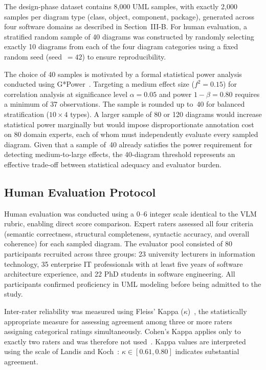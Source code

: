 \documentclass[conference]{IEEEtran}
\begin{document}
The design-phase dataset contains 8,000 UML samples, with exactly
2,000 samples per diagram type (class, object, component, package),
generated across four software domains as described in
Section~III-B. For human evaluation, a stratified random sample of
40 diagrams was constructed by randomly selecting exactly 10
diagrams from each of the four diagram categories using a fixed
random seed (seed~$= 42$) to ensure reproducibility.

The choice of 40 samples is motivated by a formal statistical power
analysis conducted using G*Power~\cite{faul2007}. Targeting a
medium effect size ($f^{2}=0.15$) for correlation analysis at
significance level $\alpha=0.05$ and power $1{-}\beta=0.80$
requires a minimum of 37 observations. The sample is rounded up
to~40 for balanced stratification ($10\times4$ types). A larger
sample of 80 or 120 diagrams would increase statistical power
marginally but would impose disproportionate annotation cost on 80
domain experts, each of whom must independently evaluate every sampled
diagram. Given that a sample of~40 already satisfies the power
requirement for detecting medium-to-large effects, the 40-diagram
threshold represents an effective trade-off between statistical
adequacy and evaluator burden.

\subsection{Human Evaluation Protocol}

Human evaluation was conducted using a 0--6 integer scale identical
to the VLM rubric, enabling direct score comparison. Expert raters
assessed all four criteria (semantic correctness, structural
completeness, syntactic accuracy, and overall coherence) for each
sampled diagram. The evaluator pool consisted of 80 participants
recruited across three groups: 23 university lecturers in information
technology, 35 enterprise IT professionals with at least five years of
software architecture experience, and 22 PhD students in software
engineering. All participants confirmed proficiency in UML modeling
before being admitted to the study.

Inter-rater reliability was measured using Fleiss' Kappa
($\kappa$)~\cite{mchugh2012}, the statistically appropriate measure
for assessing agreement among three or more raters assigning
categorical ratings simultaneously. Cohen's Kappa applies only to
exactly two raters and was therefore not used~\cite{mchugh2012}.
Kappa values are interpreted using the scale of Landis and
Koch~\cite{viera2005}: $\kappa \in [0.61, 0.80]$ indicates
substantial agreement.
\end{document}
